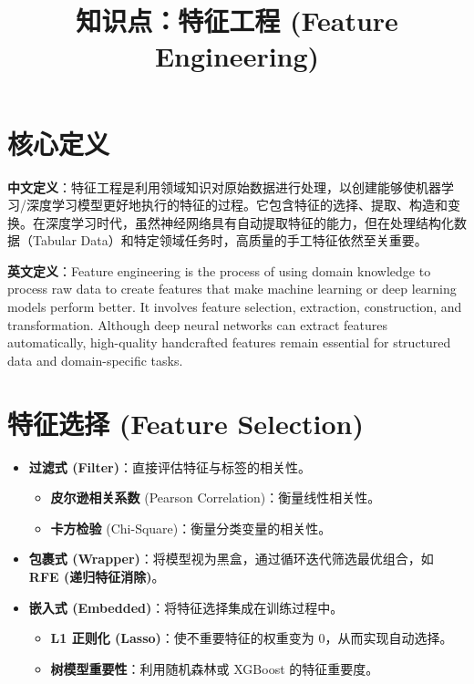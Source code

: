 \documentclass[12pt, a4paper]{article}
\title{知识点：特征工程 (Feature Engineering)}
\author{}
\date{}
\begin{document}
\maketitle

\section{核心定义}
\textbf{中文定义}：特征工程是利用领域知识对原始数据进行处理，以创建能够使机器学习/深度学习模型更好地执行的特征的过程。它包含特征的选择、提取、构造和变换。在深度学习时代，虽然神经网络具有自动提取特征的能力，但在处理结构化数据（Tabular Data）和特定领域任务时，高质量的手工特征依然至关重要。

\textbf{英文定义}：Feature engineering is the process of using domain knowledge to process raw data to create features that make machine learning or deep learning models perform better. It involves feature selection, extraction, construction, and transformation. Although deep neural networks can extract features automatically, high-quality handcrafted features remain essential for structured data and domain-specific tasks.

\section{特征选择 (Feature Selection)}

\begin{itemize}
    \item \textbf{过滤式 (Filter)}：直接评估特征与标签的相关性。
        \begin{itemize}
            \item \textbf{皮尔逊相关系数} (Pearson Correlation)：衡量线性相关性。
            \item \textbf{卡方检验} (Chi-Square)：衡量分类变量的相关性。
        \end{itemize}
    \item \textbf{包裹式 (Wrapper)}：将模型视为黑盒，通过循环迭代筛选最优组合，如 \textbf{RFE (递归特征消除)}。
    \item \textbf{嵌入式 (Embedded)}：将特征选择集成在训练过程中。
        \begin{itemize}
            \item \textbf{L1 正则化 (Lasso)}：使不重要特征的权重变为 0，从而实现自动选择。
            \item \textbf{树模型重要性}：利用随机森林或 XGBoost 的特征重要度。
        \end{itemize}
\end{itemize}
\end{document}
